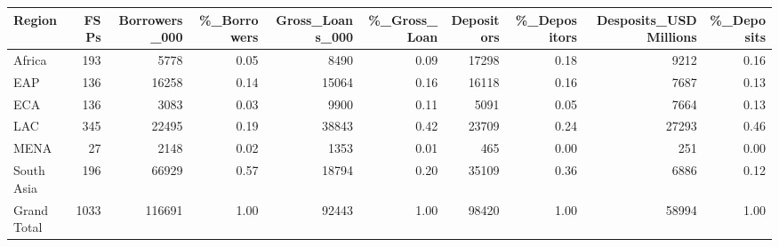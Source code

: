 \documentclass[a4paper, nobind]{templates/ociamthesis}
\begin{document}
\begin{landscape}\begin{table}
\centering\begingroup\fontsize{8}{10}\selectfont

\begin{tabular}{lrrrrrrrrr}
\toprule
Region & FSPs & Borrowers\_000 & \%\_Borrowers & Gross\_Loans\_000 & \%\_Gross\_Loan & Depositors & \%\_Depositors & Desposits\_USDMillions & \%\_Deposits\\
\midrule
Africa & 193 & 5778 & 0.05 & 8490 & 0.09 & 17298 & 0.18 & 9212 & 0.16\\
EAP & 136 & 16258 & 0.14 & 15064 & 0.16 & 16118 & 0.16 & 7687 & 0.13\\
ECA & 136 & 3083 & 0.03 & 9900 & 0.11 & 5091 & 0.05 & 7664 & 0.13\\
LAC & 345 & 22495 & 0.19 & 38843 & 0.42 & 23709 & 0.24 & 27293 & 0.46\\
MENA & 27 & 2148 & 0.02 & 1353 & 0.01 & 465 & 0.00 & 251 & 0.00\\
\addlinespace
South Asia & 196 & 66929 & 0.57 & 18794 & 0.20 & 35109 & 0.36 & 6886 & 0.12\\
Grand Total & 1033 & 116691 & 1.00 & 92443 & 1.00 & 98420 & 1.00 & 58994 & 1.00\\
\bottomrule
\end{tabular}
\endgroup{}
\end{table}
\end{landscape}

\newpage
\end{document}
